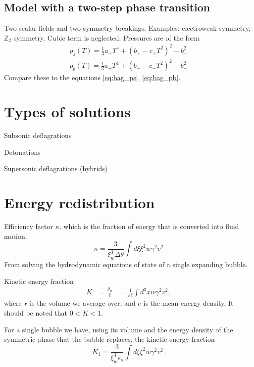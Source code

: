 \subsection{Model with a two-step phase transition}
Two scalar fields and two symmetry breakings. Examples: electroweak symmetry, $\mathbb{Z}_2$ symmetry.
Cubic term is neglected.
Pressures are of the form
\cite[eq. 47-48]{giese_2020}
\begin{align}
p_s(T) = \frac{1}{3}a_+ T^4 + (b_+ - c_+ T^2)^2 - b_-^2 \\
p_b(T) = \frac{1}{3}a_+ T^4 + (b_- - c_-T^2)^2 - b_-^2
\end{align}
Compare these to the equations \ref{eq:bag_ps}, \ref{eq:bag_pb}.



\section{Types of solutions}

Subsonic deflagrations

Detonations

Supersonic deflagrations (hybrids)


\section{Energy redistribution}
Efficiency factor $\kappa$, which is the fraction of energy that is converted into fluid motion.
\begin{equation}
\kappa = \frac{3}{\xi_w^3 \Delta \theta} \int d\xi \xi^2 w \gamma^2 v^2
\end{equation}
From solving the hydrodynamic equations of state of a single expanding bubble.

Kinetic energy fraction
\cites[eq. 7.36]{lecture_notes}[eq. 5]{giese_2020}
\begin{align}
K
&= \frac{\rho_\text{fl}}{\bar{e}}
&= \frac{1}{\mathcal{v} \bar{e}} \int d^3 x w \gamma^2 v^2,
\end{align}
where $\mathcal{v}$ is the volume we average over, and $\bar{e}$ is the mean energy density.
It should be noted that $0 < K < 1$.
\cite{giese_2020}

For a single bubble we have, using its volume and the energy density of the symmetric phase that the bubble replaces, the kinetic energy fraction
\cites[eq. 7.37]{lecture_notes}[eq. 5]{giese_2020}
\begin{equation}
K_1 = \frac{3}{\xi_w^3 e_s} \int d\xi \xi^2 w \gamma^2 v^2.
\end{equation}

